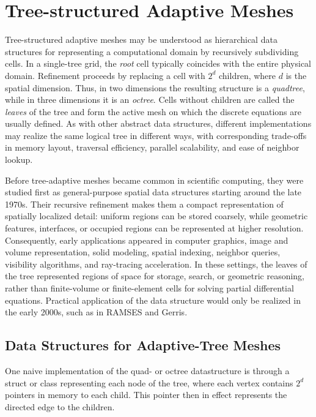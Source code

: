 \section{Tree-structured Adaptive Meshes}

Tree-structured adaptive meshes may be understood as hierarchical data
structures for representing a computational domain by recursively subdividing
cells. In a single-tree grid, the \emph{root} cell typically coincides with the
entire physical domain. Refinement proceeds by replacing a cell with \(2^d\)
children, where \(d\) is the spatial dimension. Thus, in two dimensions the
resulting structure is a \emph{quadtree}, while in three dimensions it is an
\emph{octree}. Cells without children are called the \emph{leaves} of the tree
and form the active mesh on which the discrete equations are usually defined.
As with other abstract data structures, different implementations may realize
the same logical tree in different ways, with corresponding trade-offs in
memory layout, traversal efficiency, parallel scalability, and ease of neighbor
lookup.

Before tree-adaptive meshes became common in scientific computing, they were
studied first as general-purpose spatial data structures starting around the
late 1970s. Their recursive refinement makes them a compact representation of
spatially localized detail: uniform regions can be stored coarsely, while
geometric features, interfaces, or occupied regions can be represented at
higher resolution. Consequently, early applications appeared in computer
graphics, image and volume representation, solid modeling, spatial indexing,
neighbor queries, visibility algorithms, and ray-tracing acceleration. In these
settings, the leaves of the tree represented regions of space for storage,
search, or geometric reasoning, rather than finite-volume or finite-element
cells for solving partial differential equations. Practical application of the
data structure would only be realized in the early 2000s, such as in RAMSES and
Gerris.

\subsection{Data Structures for Adaptive-Tree Meshes}

One naive implementation of the quad- or octree datastructure is through a
struct or class representing each node of the tree, where each vertex contains
\(2^d\) pointers in memory to each child. This pointer then in effect
represents the directed edge to the children.

